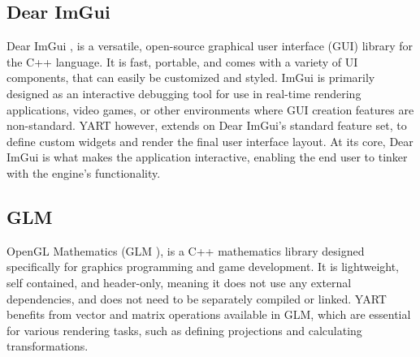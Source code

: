 \subsection{Dear ImGui}

Dear ImGui \supercite{DearImGui}, is a versatile, open-source graphical user interface (GUI) library for the C++ language. 
It is fast, portable, and comes with a variety of UI components, that can easily be customized and styled.
ImGui is primarily designed as an interactive debugging tool for use in real-time rendering applications, video games, or other environments where GUI creation features are non-standard.
YART however, extends on Dear ImGui's standard feature set, to define custom widgets and render the final user interface layout. 
At its core, Dear ImGui is what makes the application interactive, enabling the end user to tinker with the engine's functionality.

\subsection{GLM}

OpenGL Mathematics (GLM \supercite{GLM}), is a C++ mathematics library designed specifically for graphics programming and game development.
It is lightweight, self contained, and header-only, meaning it does not use any external dependencies, and does not need to be separately compiled or linked.
YART benefits from vector and matrix operations available in GLM, which are essential for various rendering tasks, such as defining projections and calculating transformations.
